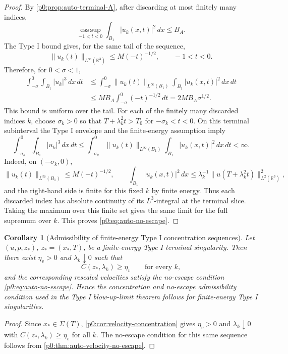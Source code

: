 \documentclass[11pt]{amsart}
\theoremstyle{plain}
\newtheorem{corollary}[corollary]{Corollary}
\theoremstyle{definition}
\theoremstyle{remark}
\numberwithin{equation}{section}
\begin{document}
\begin{proof}
By \cref{p0:prop:auto-terminal-A}, after discarding at most finitely many indices,
\[
  \operatorname*{ess\,sup}_{-1<t<0}\int_{B_1}|u_k(x,t)|^2\,dx\le B_A .
\]
The Type I bound gives, for the same tail of the sequence,
\[
  \|u_k(t)\|_{L^\infty(\mathbb R^3)}
  \le M(-t)^{-1/2},
  \qquad -1<t<0 .
\]
Therefore, for \(0<\sigma<1\),
\[
\begin{aligned}
  \int_{-\sigma}^{0}\int_{B_1}|u_k|^3\,dx\,dt
  &\le
  \int_{-\sigma}^{0}\|u_k(t)\|_{L^\infty(B_1)}
       \int_{B_1}|u_k(x,t)|^2\,dx\,dt  \\
  &\le M B_A\int_{-\sigma}^{0}(-t)^{-1/2}\,dt
   =2M B_A\sigma^{1/2} .
\end{aligned}
\]
This bound is uniform over the tail.  For each of the finitely many discarded
indices \(k\), choose \(\sigma_k>0\) so that
\(T+\lambda_k^2t>T_0\) for \(-\sigma_k<t<0\).  On this terminal subinterval
the Type I envelope and the finite-energy assumption imply
\[
  \int_{-\sigma_k}^{0}\int_{B_1}|u_k|^3\,dx\,dt
  \le
  \int_{-\sigma_k}^{0}\|u_k(t)\|_{L^\infty(B_1)}
       \int_{B_1}|u_k(x,t)|^2\,dx\,dt
  <\infty .
\]
Indeed, on \((-\sigma_k,0)\),
\[
  \|u_k(t)\|_{L^\infty(B_1)}\le M(-t)^{-1/2},
  \qquad
  \int_{B_1}|u_k(x,t)|^2\,dx
  \le \lambda_k^{-1}\|u(T+\lambda_k^2t)\|_{L^2(\mathbb R^3)}^2,
\]
and the right-hand side is finite for this fixed \(k\) by finite energy.
Thus each discarded index has absolute continuity of its \(L^3\)-integral at
the terminal slice.  Taking the maximum over this finite set gives the same
limit for the full supremum over \(k\).  This proves
\eqref{p0:eq:auto-no-escape}.
\end{proof}

\begin{corollary}[Admissibility of finite-energy Type I concentration sequences]
\label{p0:cor:auto-paperI-admissibility}
Let \((u,p,z_*)\), \(z_*=(x_*,T)\), be a finite-energy Type I terminal
singularity.  Then there exist \(\eta_v>0\) and \(\lambda_k\downarrow0\) such
that
\[
  C(z_*,\lambda_k)\ge\eta_v
  \qquad\text{for every }k,
\]
and the corresponding rescaled velocities satisfy the no-escape condition
\eqref{p0:eq:auto-no-escape}.  Hence the concentration and no-escape
admissibility condition used in the Type I blow-up-limit theorem
 follows for finite-energy Type I singularities.
\end{corollary}

\begin{proof}
Since \(x_*\in\Sigma(T)\), \cref{p0:cor:velocity-concentration} gives
\(\eta_v>0\) and \(\lambda_k\downarrow0\) with
\(C(z_*,\lambda_k)\ge\eta_v\) for all \(k\).  The no-escape condition for this
same sequence follows from \cref{p0:thm:auto-velocity-no-escape}.
\end{proof}
\end{document}
